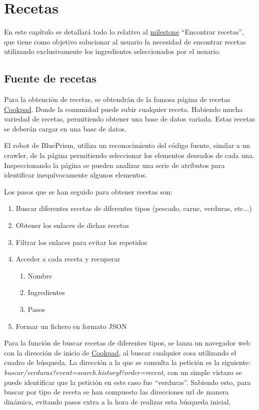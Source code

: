 \chapter{Recetas}
En este capítulo se detallará todo lo relativo al \href{https://github.com/Slowmybrosh/TFG-DietPlanner/milestone/3}{milestone} ``Encontrar recetas'', que tiene como objetivo solucionar al usuario la necesidad de encontrar recetas utilizando exclusivamente los ingredientes seleccionados por el usuario.

\section{Fuente de recetas}
Para la obtención de recetas, se obtendrán de la famosa página de recetas \href{https://cookpad.com/es/home}{Cookpad}. Donde la comunidad puede subir cualquier receta. Habiendo mucha variedad de recetas, permitiendo obtener una base de datos variada. Estas recetas se deberán cargar en una base de datos.

El robot de BluePrism, utiliza un reconocimiento del código fuente, similar a un crawler, de la página permitiendo seleccionar los elementos deseados de cada una. Inspeccionando la página se pueden analizar una serie de atributos para identificar inequívocamente algunos elementos.

Los pasos que se han seguido para obtener recetas son:
\begin{enumerate}
    \item Buscar diferentes recetas de diferentes tipos (pescado, carne, verduras, etc...)
    \item Obtener los enlaces de dichas recetas
    \item Filtrar los enlaces para evitar los repetidos
    \item Acceder a cada receta y recuperar
    \begin{enumerate}
        \item Nombre
        \item Ingredientes
        \item Pasos
    \end{enumerate}
    \item Formar un fichero en formato JSON
\end{enumerate}

Para la función de buscar recetas de diferentes tipos, se lanza un navegador web con la dirección de inicio de \href{https://cookpad.com/es/home}{Cookpad}, al buscar cualquier cosa utilizando el cuadro de búsqueda. La dirección a la que se consulta la petición es la siguiente: \emph{buscar/verduras?event=search.history&order=recent}, con un simple vistazo se puede identificar que la petición en este caso fue ``verduras''. Sabiendo esto, para buscar por tipo de receta se han compuesto las direcciones url de manera dinámica, evitando pasos extra a la hora de realizar esta búsqueda inicial. 

